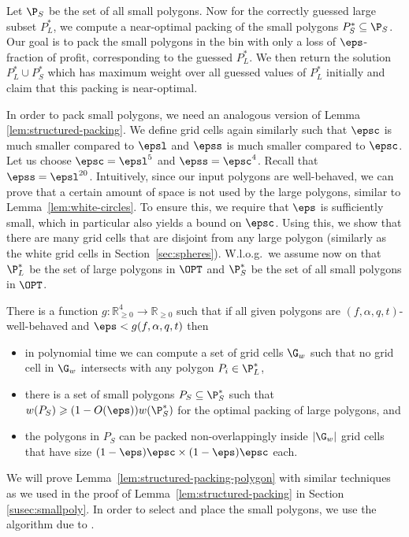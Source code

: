 Let $\P_{S}$ be the set of all small polygons. 
Now for the correctly guessed large subset $P_L ^*$, we compute a near-optimal packing of the small polygons $P_S^* \subseteq \P_{S}$. Our goal is to pack the small polygons in the bin with only a loss of $\eps$-fraction of profit, corresponding to the guessed $P_L^*$. We then return the solution $P_L^* \cup P_S^*$ which has maximum weight over all guessed values of $P_L^*$ initially and claim that this packing is near-optimal.

In order to pack small polygons, we need an analogous version of Lemma \ref{lem:structured-packing}.
We define grid cells again similarly such that $\epsc$ is much smaller compared to $\epsl$ and $\epss$ is much smaller compared to $\epsc$.
Let us choose $\epsc= \epsl^{5}$ and $\epss=\epsc^{4}$. Recall that $\epss = \epsl^{20}$.
{Intuitively, since our input polygons are well-behaved, we can prove that a certain amount of space is not used by the large polygons, similar to Lemma~\ref{lem:white-circles}.} To ensure this, we require that $\eps$ is sufficiently small, which in particular also yields a bound on $\epsc$. Using this, we show that there are many grid cells that are disjoint from any large polygon (similarly as the white grid cells in Section~\ref{sec:spheres}).
W.l.o.g.~we assume now on that $\P_{L}^{*}$ be the set of large polygons in $\OPT$ and $\P_{S}^{*}$ be the set of all small polygons in $\OPT$.

\begin{lemma}\label{lem:structured-packing-polygon}
	There is a function $g:\mathbb{R}^4_{\geqslant 0} \rightarrow \mathbb{R}_{\geqslant 0}$ such that if all given polygons are $(f,\alpha,q, t)$-well-behaved and $\eps < g(f,\alpha,q,t)$ then
	\begin{itemize}
	 \item in polynomial time we can compute a set of grid cells $\G_w$ such that no grid cell in $\G_w$ intersects with any
	polygon $P_i \in\P_{L}^{*}$,
	\item there is a set of small polygons $P_S \subseteq \P_{S}^*$ such that $w(P_{S}) \geqslant (1-O(\eps))w(\P_{S}^{*})$ for the optimal packing of large polygons, and
	\item the polygons in $P_S$ can be packed non-overlappingly inside $|\G_w|$ grid cells that have size
	\mbox{$(1-\eps) \epsc \times (1-\eps) \epsc$} each.
	\end{itemize}
\end{lemma}
We will prove Lemma~\ref{lem:structured-packing-polygon} {with similar techniques as we used in the proof of Lemma~\ref{lem:structured-packing}} in Section \ref{susec:smallpoly}.
In order to select and place the small polygons, we use the algorithm due to . 

